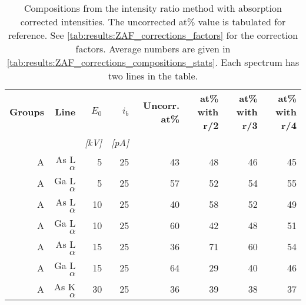 \begin{table}[phtb]
    \begin{center}
        \caption{
            Compositions from the intensity ratio method with absorption corrected intensities. The uncorrected at\% value is tabulated for reference.
            See \cref{tab:results:ZAF_corrections_factors} for the correction factors.
            Average numbers are given in \cref{tab:results:ZAF_corrections_compositions_stats}.
            Each spectrum has two lines in the table.
        }
        \label{tab:results:ZAF_corrections_compositions}
        \begin{tabular}{rrrrrrrr}
            \hline
            \textbf{Groups} & \textbf{Line} & \textbf{$E_0$} & \textbf{$i_b$} & \textbf{Uncorr. at\%} & \textbf{at\% with r/2} & \textbf{at\% with r/3} & \textbf{at\% with r/4} \\
            \emph{}         & \emph{}       & \emph{[kV]}    & \emph{[pA]}    & \emph{}               & \emph{}                & \emph{}                & \emph{}                \\
            \hline
            A               & As L$\alpha$  & 5              & 25             & 43                    & 48                     & 46                     & 45                     \\
            A               & Ga L$\alpha$  & 5              & 25             & 57                    & 52                     & 54                     & 55                     \\
            A               & As L$\alpha$  & 10             & 25             & 40                    & 58                     & 52                     & 49                     \\
            A               & Ga L$\alpha$  & 10             & 25             & 60                    & 42                     & 48                     & 51                     \\
            A               & As L$\alpha$  & 15             & 25             & 36                    & 71                     & 60                     & 54                     \\
            A               & Ga L$\alpha$  & 15             & 25             & 64                    & 29                     & 40                     & 46                     \\
            A               & As K$\alpha$  & 30             & 25             & 36                    & 39                     & 38                     & 37                     \\

\end{tabular}
\end{center}
\end{table}
